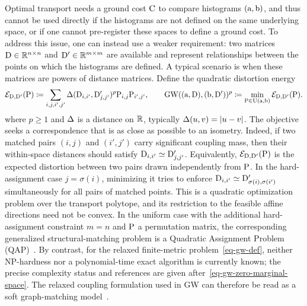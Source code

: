 Optimal transport needs a ground cost $\C$ to compare histograms $(\a,\b)$, and thus cannot be used directly if the histograms are not defined on the same underlying space, or if one cannot pre-register these spaces to define a ground cost.
%
To address this issue, one can instead use a weaker requirement: two matrices $\distD \in \RR^{n \times n}$ and $\distD' \in \RR^{m \times m}$ are available and represent relationships between the points on which the histograms are defined. A typical scenario is when these matrices are powers of distance matrices.
%
Define the quadratic distortion energy
\begin{equation}\label{eq-gw-def}
	\Ee_{\distD,\distD'}(\P)
	\eqdef
	\sum_{i,j,i',j'} \De(\distD_{i,i'},\distD'_{j,j'})^p \P_{i,j}\P_{i',j'},
	\qquad
	\GWD( (\a,\distD), (\b,\distD') )^p
	\eqdef
	\min_{\P \in \CouplingsD(\a,\b) }
	\Ee_{\distD,\distD'}(\P).
\end{equation}
where $p \geq 1$ and $\De$ is a distance on $\RR$, typically $\De(u,v)=|u-v|$.
%
The objective seeks a correspondence that is as close as possible to an isometry. Indeed, if two matched pairs $(i,j)$ and $(i',j')$ carry significant coupling mass, then their within-space distances should satisfy $\distD_{i,i'} \simeq \distD'_{j,j'}$.
Equivalently, $\Ee_{\distD,\distD'}(\P)$ is the expected distortion between two pairs drawn independently from $\P$. In the hard-assignment case $j=\sigma(i)$, minimizing it tries to enforce $\distD_{i,i'}\simeq\distD'_{\sigma(i),\sigma(i')}$ simultaneously for all pairs of matched points.
%
This is a quadratic optimization problem over the transport polytope, and its restriction to the feasible affine directions need not be convex. In the uniform case with the additional hard-assignment constraint $m=n$ and $\P$ a permutation matrix, the corresponding generalized structural-matching problem is a Quadratic Assignment Problem (QAP)~\cite{loiola-2007}. By contrast, for the relaxed finite-metric problem~\eqref{eq-gw-def}, neither NP-hardness nor a polynomial-time exact algorithm is currently known; the precise complexity status and references are given after~\eqref{eq-gw-zero-marginal-space}.
%
The relaxed coupling formulation used in GW can therefore be read as a soft graph-matching model~\cite{lyzinski-2015}.

